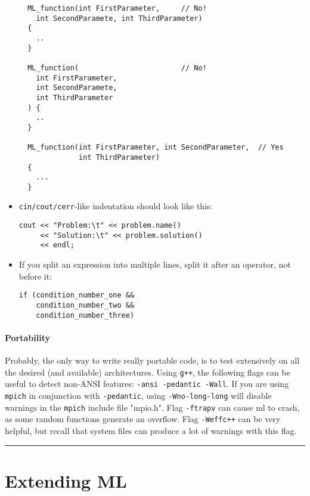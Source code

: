 \documentclass[10pt,letter,relax]{SANDreport}
\newcommand{\HRule}{\noindent\rule{\linewidth}{1mm}}
\newcommand{\ML}     {{\sc ml }}
\begin{document}
\begin{itemize}
  \begin{verbatim}
  ML_function(int FirstParameter,     // No!
    int SecondParamete, int ThirdParameter)
  {
    ..
  }

  ML_function(                        // No!
    int FirstParameter,
    int SecondParamete,
    int ThirdParameter
  ) {
    ..
  }    

  ML_function(int FirstParameter, int SecondParameter,  // Yes
              int ThirdParameter)
  {
    ...
  }      
  \end{verbatim}
\item \verb!cin/cout/cerr!-like indentation should look like this:
\begin{verbatim}
cout << "Problem:\t" << problem.name()
     << "Solution:\t" << problem.solution()
     << endl;
\end{verbatim}
\item If you split an expression into multiple lines, split it after an operator, not before it:
\begin{verbatim}
if (condition_number_one &&
    condition_number_two &&
    condition_number_three)
\end{verbatim}
\end{itemize}

\subsection{Portability}

Probably, the only way to write really portable code, is to test
extensively on all the desired (and available) architectures. Using
\verb!g++!, the following flags can be useful to detect non-ANSI
features: \verb!-ansi -pedantic -Wall!.
If you are using \verb!mpich! in conjunction with \verb!-pedantic!, using
\verb!-Wno-long-long! will disable warnings in the \verb!mpich! include file
"mpio.h".
Flag \verb!-ftrapv! can cause
\ML to crash, as some random functions generate an overflow. Flag
\verb!-Weffc++! can be very helpful, but recall that system files can
produce a lot of warnings with this flag.


\clearpage
\newpage

\vspace*{3cm}
\HRule
\part{Extending ML}
\end{document}
